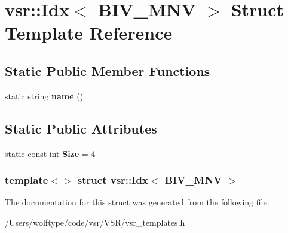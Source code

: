 \hypertarget{structvsr_1_1_idx_3_01_b_i_v___m_n_v_01_4}{\section{vsr\-:\-:Idx$<$ B\-I\-V\-\_\-\-M\-N\-V $>$ Struct Template Reference}
\label{structvsr_1_1_idx_3_01_b_i_v___m_n_v_01_4}
}
\subsection*{Static Public Member Functions}
\begin{DoxyCompactItemize}
\item 
\hypertarget{structvsr_1_1_idx_3_01_b_i_v___m_n_v_01_4_a0afcdc341bd253d703771ce8466474ce}{static string {\bfseries name} ()}\label{structvsr_1_1_idx_3_01_b_i_v___m_n_v_01_4_a0afcdc341bd253d703771ce8466474ce}

\end{DoxyCompactItemize}
\subsection*{Static Public Attributes}
\begin{DoxyCompactItemize}
\item 
\hypertarget{structvsr_1_1_idx_3_01_b_i_v___m_n_v_01_4_ae65f9bc54f349693d474c13114a04c9a}{static const int {\bfseries Size} = 4}\label{structvsr_1_1_idx_3_01_b_i_v___m_n_v_01_4_ae65f9bc54f349693d474c13114a04c9a}

\end{DoxyCompactItemize}
\subsubsection*{template$<$$>$ struct vsr\-::\-Idx$<$ B\-I\-V\-\_\-\-M\-N\-V $>$}



The documentation for this struct was generated from the following file\-:\begin{DoxyCompactItemize}
\item 
/\-Users/wolftype/code/vsr/\-V\-S\-R/vsr\-\_\-templates.\-h\end{DoxyCompactItemize}
